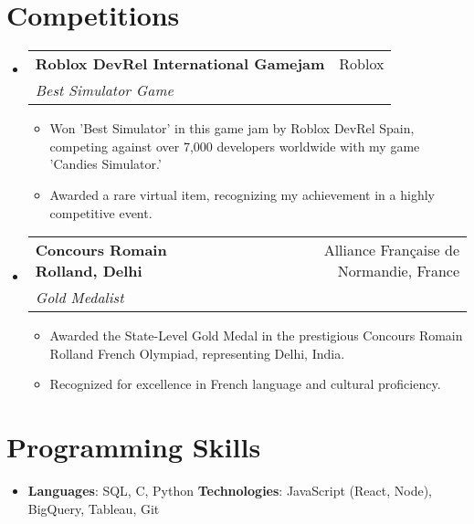 \documentclass[letterpaper,11pt]{article}
\makeatletter
\newcommand{\resumeSubheading}[4]{
  \vspace{-1pt}\item
    \begin{tabular*}{0.97\textwidth}{l@{\extracolsep{\fill}}r}
      \textbf{#1} & #2 \\
      \textit{\small#3} & \textit{\small #4} \\
    \end{tabular*}\vspace{-5pt}
}
\newcommand{\resumeSubHeadingListStart}{\begin{itemize}[leftmargin=*]}
\newcommand{\resumeSubHeadingListEnd}{\end{itemize}}
\newcommand{\resumeItemListStart}{\begin{itemize}}
\newcommand{\resumeItemListEnd}{\end{itemize}\vspace{-5pt}}
\makeatother
\begin{document}
\section*{Competitions}
\resumeSubHeadingListStart
  \resumeSubheading
    {Roblox DevRel International Gamejam}{Roblox}
    {Best Simulator Game}{}
    \resumeItemListStart
      \item Won 'Best Simulator' in this game jam by Roblox DevRel Spain, competing against over 7,000 developers worldwide with my game 'Candies Simulator.' 
      \item Awarded a rare virtual item, recognizing my achievement in a highly competitive event.
    \resumeItemListEnd
  
  \resumeSubheading
    {Concours Romain Rolland, Delhi}{Alliance Française de Normandie, France}
    {Gold Medalist}{}
    \resumeItemListStart
      \item Awarded the State-Level Gold Medal in the prestigious Concours Romain Rolland French Olympiad, representing Delhi, India.
      \item Recognized for excellence in French language and cultural proficiency.
    \resumeItemListEnd
\resumeSubHeadingListEnd

\section*{Programming Skills}
\resumeSubHeadingListStart
  \item{
    \textbf{Languages}{: SQL, C, Python}
    \hfill
    \textbf{Technologies}{: JavaScript (React, Node), BigQuery, Tableau, Git}
  }
\resumeSubHeadingListEnd
\end{document}
